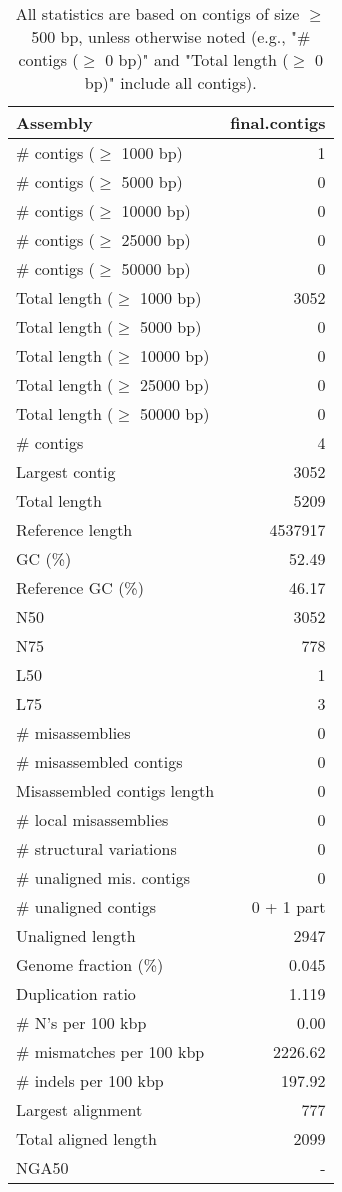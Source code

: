\documentclass[12pt,a4paper]{article}
\begin{document}
\begin{table}[ht]
\begin{center}
\caption{All statistics are based on contigs of size $\geq$ 500 bp, unless otherwise noted (e.g., "\# contigs ($\geq$ 0 bp)" and "Total length ($\geq$ 0 bp)" include all contigs).}
\begin{tabular}{|l*{1}{|r}|}
\hline
Assembly & final.contigs \\ \hline
\# contigs ($\geq$ 1000 bp) & 1 \\ \hline
\# contigs ($\geq$ 5000 bp) & 0 \\ \hline
\# contigs ($\geq$ 10000 bp) & 0 \\ \hline
\# contigs ($\geq$ 25000 bp) & 0 \\ \hline
\# contigs ($\geq$ 50000 bp) & 0 \\ \hline
Total length ($\geq$ 1000 bp) & 3052 \\ \hline
Total length ($\geq$ 5000 bp) & 0 \\ \hline
Total length ($\geq$ 10000 bp) & 0 \\ \hline
Total length ($\geq$ 25000 bp) & 0 \\ \hline
Total length ($\geq$ 50000 bp) & 0 \\ \hline
\# contigs & 4 \\ \hline
Largest contig & 3052 \\ \hline
Total length & 5209 \\ \hline
Reference length & 4537917 \\ \hline
GC (\%) & 52.49 \\ \hline
Reference GC (\%) & 46.17 \\ \hline
N50 & 3052 \\ \hline
N75 & 778 \\ \hline
L50 & 1 \\ \hline
L75 & 3 \\ \hline
\# misassemblies & 0 \\ \hline
\# misassembled contigs & 0 \\ \hline
Misassembled contigs length & 0 \\ \hline
\# local misassemblies & 0 \\ \hline
\# structural variations & 0 \\ \hline
\# unaligned mis. contigs & 0 \\ \hline
\# unaligned contigs & 0 + 1 part \\ \hline
Unaligned length & 2947 \\ \hline
Genome fraction (\%) & 0.045 \\ \hline
Duplication ratio & 1.119 \\ \hline
\# N's per 100 kbp & 0.00 \\ \hline
\# mismatches per 100 kbp & 2226.62 \\ \hline
\# indels per 100 kbp & 197.92 \\ \hline
Largest alignment & 777 \\ \hline
Total aligned length & 2099 \\ \hline
NGA50 & - \\ \hline
\end{tabular}
\end{center}
\end{table}
\end{document}
